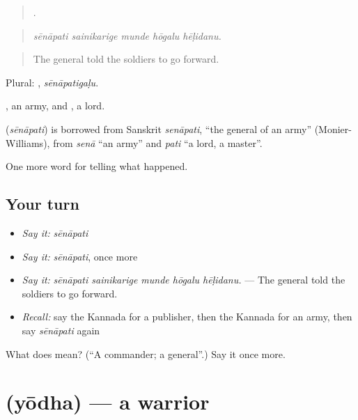 \begin{quote}
    .
\end{quote}

\begin{quote}
\emph{sēnāpati sainikarige munde hōgalu hēḷidanu.}
\end{quote}

\begin{quote}
The general told the soldiers to go forward.
\end{quote}

Plural: , \emph{sēnāpatigaḷu}.

, an army, and , a lord.

\begin{cousinweb}
\textbf{} (\emph{sēnāpati}) is borrowed from Sanskrit \emph{senāpati}, \textquotedblleft{}the general of an army\textquotedblright{} (Monier-Williams), from \emph{senā} \textquotedblleft{}an army\textquotedblright{} and \emph{pati} \textquotedblleft{}a lord, a master\textquotedblright{}.
\end{cousinweb}

\begin{grammarlens}[title={What you've built}]
One more word for telling what happened.
\end{grammarlens}

\subsection*{Your turn}
\begin{itemize}
\raggedright
  \item \emph{Say it:} \emph{sēnāpati}
  \item \emph{Say it:} \emph{sēnāpati}, once more
  \item \emph{Say it:} \emph{sēnāpati sainikarige munde hōgalu hēḷidanu.} — The general told the soldiers to go forward.
  \item \emph{Recall:} say the Kannada for a publisher, then the Kannada for an army, then say \emph{sēnāpati} again
\end{itemize}

\begin{tcolorbox}[breakable,colback=teal!4,colframe=teal!35!black,title={Before you move on}]
What does  mean? (\textquotedblleft{}A commander; a general\textquotedblright{}.) Say it once more.
\end{tcolorbox}
\section[\texorpdfstring{\kn{ಯೋಧ} (yōdha)}{ಯೋಧ (yōdha)}]{ (yōdha) — a warrior}


